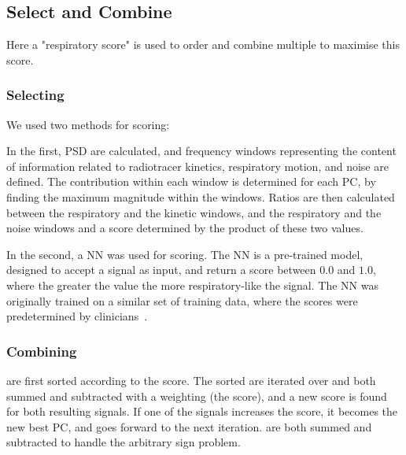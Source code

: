     
    \subsection{Select and Combine} \label{sec:select_and_combine}
        Here a "respiratory score" is used to order and combine multiple  to maximise this score.
        
        \subsubsection{Selecting } \label{sec:selecting_pcs}
              We used two methods for scoring:
              
              In the first, \gls{PSD} are calculated, and frequency windows representing the content of information related to radiotracer kinetics, respiratory motion, and noise are defined. The contribution within each window is determined for each \gls{PC}, by finding the maximum magnitude within the windows. Ratios are then calculated between the respiratory and the kinetic windows, and the respiratory and the noise windows and a score determined by the product of these two values.
        
        
            In the second, a \gls{NN} was used for scoring. The \gls{NN} is a pre-trained model, designed to accept a signal as input, and return a score between $0.0$ and $1.0$, where the greater the value the more respiratory-like the signal. The \gls{NN} was originally trained on a similar set of training data, where the scores were predetermined by clinicians~\cite{Walker2020AutomaticAI}.
        
        
        \subsubsection{Combining } \label{sec:combining_pcs}
             are first sorted according to the score. The sorted  are iterated over and both summed and subtracted with a weighting (the score), and a new score is found for both resulting signals. If one of the signals increases the score, it becomes the new best \gls{PC}, and goes forward to the next iteration.  are both summed and subtracted to handle the arbitrary sign problem.
            
